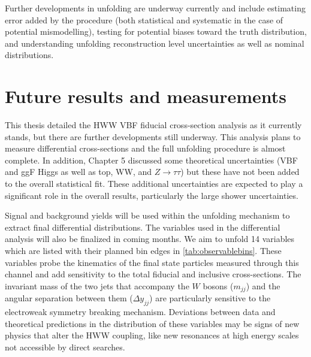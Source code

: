 Further developments in unfolding are underway currently and include estimating error added by the procedure (both statistical and systematic in the case of potential mismodelling), testing for potential biases toward the truth distribution, and understanding unfolding reconstruction level uncertainties as well as nominal distributions. 

\section{Future results and measurements}

This thesis detailed the HWW VBF fiducial cross-section analysis as it currently stands, but there are further developments still underway. This analysis plans to measure differential cross-sections and the full unfolding procedure is almost complete. In addition, Chapter 5 discussed some theoretical uncertainties (VBF and ggF Higgs as well as top, WW, and $Z\rightarrow \tau\tau$) but these have not been added to the overall statistical fit. These additional uncertainties are expected to play a significant role in the overall results, particularly the large shower uncertainties. 

Signal and background yields will be used within the unfolding mechanism to extract final differential distributions. The variables used in the differential analysis will also be finalized in coming months. We aim to unfold 14 variables which are listed with their planned bin edges in \ref{tab:observablebins}. These variables probe the kinematics of the final state particles measured through this channel and add sensitivity to the total fiducial and inclusive cross-sections. The invariant mass of the two jets that accompany the $W$ bosons ($m_{jj}$) and the angular separation between them ($\Delta y_{jj}$) are particularly sensitive to the electroweak symmetry breaking mechanism. Deviations between data and theoretical predictions in the distribution of these variables may be signs of new physics that alter the HWW coupling, like new resonances at high energy scales not accessible by direct searches.                

